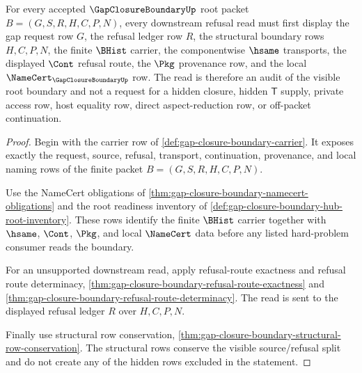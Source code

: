 \begin{theorem}
\label{thm:gap-closure-boundary-root-visible-refusal-audit}
For every accepted $\GapClosureBoundaryUp$ root packet $B=(G,S,R,H,C,P,N)$, every downstream refusal read must first display the gap request row $G$, the refusal ledger row $R$, the structural boundary rows $H,C,P,N$, the finite $\BHist$ carrier, the componentwise $\hsame$ transports, the displayed $\Cont$ refusal route, the $\Pkg$ provenance row, and the local $\NameCert_{\GapClosureBoundaryUp}$ row. The read is therefore an audit of the visible root boundary and not a request for a hidden closure, hidden $\mathsf{T}$ supply, private access row, host equality row, direct aspect-reduction row, or off-packet continuation.
\end{theorem}
\begin{proof}
Begin with the carrier row of \autoref{def:gap-closure-boundary-carrier}. It exposes exactly the request, source, refusal, transport, continuation, provenance, and local naming rows of the finite packet $B=(G,S,R,H,C,P,N)$.

Use the NameCert obligations of \autoref{thm:gap-closure-boundary-namecert-obligations} and the root readiness inventory of \autoref{def:gap-closure-boundary-hub-root-inventory}. These rows identify the finite $\BHist$ carrier together with $\hsame$, $\Cont$, $\Pkg$, and local $\NameCert$ data before any listed hard-problem consumer reads the boundary.

For an unsupported downstream read, apply refusal-route exactness and refusal route determinacy, \autoref{thm:gap-closure-boundary-refusal-route-exactness} and \autoref{thm:gap-closure-boundary-refusal-route-determinacy}. The read is sent to the displayed refusal ledger $R$ over $H,C,P,N$.

Finally use structural row conservation, \autoref{thm:gap-closure-boundary-structural-row-conservation}. The structural rows conserve the visible source/refusal split and do not create any of the hidden rows excluded in the statement.
\end{proof}

